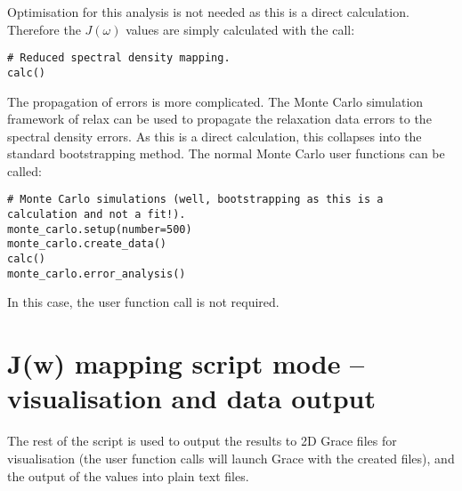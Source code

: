 Optimisation for this analysis is not needed as this is a direct calculation.  Therefore the $J(\omega)$ values are simply calculated with the call:

\begin{lstlisting}[firstnumber=31]
# Reduced spectral density mapping.
calc()
\end{lstlisting}

The propagation of errors is more complicated.  The Monte Carlo simulation framework of relax can be used to propagate the relaxation data errors to the spectral density errors.  As this is a direct calculation, this collapses into the standard bootstrapping method.  The normal Monte Carlo user functions can be called:

\begin{lstlisting}[firstnumber=34]
# Monte Carlo simulations (well, bootstrapping as this is a calculation and not a fit!).
monte_carlo.setup(number=500)
monte_carlo.create_data()
calc()
monte_carlo.error_analysis()
\end{lstlisting}

In this case, the  user function call is not required.



\section{J(w) mapping script mode -- visualisation and data output}

The rest of the script is used to output the results to 2D Grace files for visualisation (the  user function calls will launch Grace with the created files), and the output of the values into plain text files.
